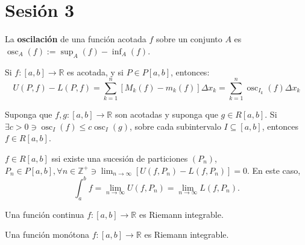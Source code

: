 \section{Sesión 3}

\begin{definicion}
	La \textbf{oscilación} de una función acotada $f$ sobre un conjunto $A$ es $\operatorname{osc}_A(f):= \sup_A(f)-\inf_A(f)$. 
\end{definicion}

\begin{nota}
	Si $f:[a,b]\to\mathbb{R}$ es acotada, y si $P\in P[a,b]$, entonces: 
	$$U(P,f)-L(P,f)=\sum_{k=1}^{n}[M_k(f)-m_k(f)]\Delta x_k=\sum_{k=1}^{n}\operatorname{osc}_{I_k}(f)\Delta x_k$$
\end{nota}

\begin{prop}
	Suponga que $f,g:[a,b]\to \mathbb{R}$ son acotadas y suponga que $g\in R[a,b]$. Si $\exists c>0\ni \operatorname{osc}_I(f)\leq c\operatorname{osc}_I(g)$, sobre cada subintervalo $I\subseteq [a,b]$, entonces $f\in R[a,b]$. 
\end{prop}

\begin{teorema}
	$f\in R[a,b]$ ssi existe una sucesión de particiones $(P_n)$, $P_n\in P[a,b], \forall n\in \mathbb{Z}^+ \ni \lim_{n\to\infty}\left[U(f,P_n)-L(f,P_n)\right]=0$. En este caso, 
	$$\int_a^b f=\lim_{n\to \infty}U(f,P_n)=\lim_{n\to\infty}L(f,P_n).$$
\end{teorema}

\begin{teorema}
	Una función continua $f:[a,b]\to\mathbb{R}$ es Riemann integrable. 
\end{teorema}

\begin{teorema}
	Una función monótona $f:[a,b]\to\mathbb{R}$ es Riemann integrable. 
\end{teorema}

